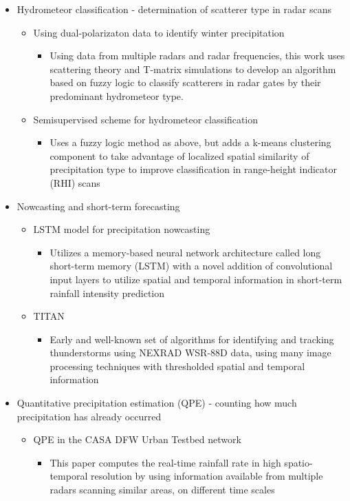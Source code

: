 \begin{itemize}
	\item Hydrometeor classification - determination of scatterer type in radar scans
	\begin{itemize}
		\item Using dual-polarizaton data to identify winter precipitation \cite{thompson2014dual}
		\begin{itemize}
			\item Using data from multiple radars and radar frequencies, this work uses scattering theory and T-matrix simulations to develop an algorithm based on fuzzy logic to classify scatterers in radar gates by their predominant hydrometeor type.
		\end{itemize}
		\item Semisupervised scheme for hydrometeor classification \cite{bechini2015semisupervised}
		\begin{itemize}
			\item Uses a fuzzy logic method as above, but adds a k-means clustering component to take advantage of localized spatial similarity of precipitation type to improve classification in range-height indicator (RHI) scans
		\end{itemize}
	\end{itemize}
	\item Nowcasting and short-term forecasting
	\begin{itemize} 
		\item LSTM model for precipitation nowcasting \cite{xingjian2015convolutional}
		\begin{itemize}
			\item Utilizes a memory-based neural network architecture called long short-term memory (LSTM) with a novel addition of convolutional input layers to utilize spatial and temporal information in short-term rainfall intensity prediction 
		\end{itemize}
		\item TITAN \cite{dixon1993titan}
		\begin{itemize}
			\item Early and well-known set of algorithms for identifying and tracking thunderstorms using NEXRAD WSR-88D data, using many image processing techniques with thresholded spatial and temporal information
		\end{itemize}
	\end{itemize}
	\item Quantitative precipitation estimation (QPE) - counting how much precipitation has already occurred 
	\begin{itemize}
		\item QPE in the CASA DFW Urban Testbed network \cite{chen2015quantitative}
		\begin{itemize}
			\item This paper computes the real-time rainfall rate in high spatio-temporal resolution by using information available from multiple radars scanning similar areas, on different time scales
		\end{itemize}
	\end{itemize}
\end{itemize}

